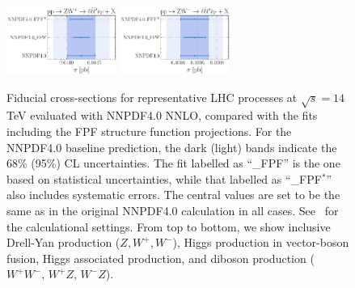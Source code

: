 \begin{figure}[t]
\includegraphics[width=0.32\textwidth]{plots/LHCpheno/NNPDF_WPZ_14TEV_40_PHENO-integrated.pdf}
\includegraphics[width=0.32\textwidth]{plots/LHCpheno/NNPDF_WMZ_14TEV_40_PHENO-integrated.pdf}
\caption{Fiducial cross-sections for representative LHC processes at $\sqrt{s}=14$ TeV
evaluated with NNPDF4.0 NNLO, compared with the fits including the FPF structure function projections.
%
For the NNPDF4.0 baseline
prediction, the dark (light) bands indicate the 68\% (95\%) CL uncertainties.
%
The fit labelled as ``\_FPF'' is the one  based on statistical uncertainties,
while that labelled as ``\_FPF$^*$'' also includes systematic errors.
%
The central values are set to be the same as in the original NNPDF4.0 calculation in all cases.
%
See~\cite{NNPDF:2021njg,PDF4LHCWorkingGroup:2022cjn} for the calculational settings.
%
From top to bottom, we show inclusive Drell-Yan production ($Z, W^+, W^-$), Higgs production
in vector-boson fusion, Higgs associated
production, and diboson production ($W^+W^-$, $W^+Z$, $W^-Z$).
%
}
\label{fig:NNPDF40_pheno_integrated}
\end{figure}


